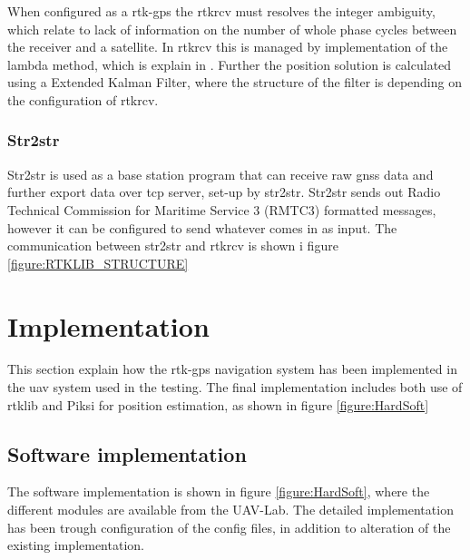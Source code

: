 When configured as a \gls{rtk-gps} the rtkrcv must resolves the integer ambiguity, which relate to lack of information on the number of whole phase cycles between the receiver and a satellite. In rtkrcv this is managed by implementation of the \gls{lambda} method, which is explain in \citep{LAMBDAMETHOD,Ambiguity:Estimation,LAMBDA:METHOD}.
Further the position solution is calculated using a Extended Kalman Filter, where the structure of the filter is depending on the configuration of rtkrcv.
\subsubsection{Str2str}
Str2str is used as a base station program that can receive raw \gls{gnss} data and further export data over tcp server, set-up by str2str. Str2str sends out Radio Technical Commission for Maritime Service 3 (RMTC3) formatted messages, however it can be configured to send whatever comes in as input. The communication between str2str and rtkrcv is shown i figure \ref{figure:RTKLIB_STRUCTURE}
\section{Implementation}
This section explain how the \gls{rtk-gps} navigation system has been implemented in the \gls{uav} system used in the testing. The final implementation includes both use of \gls{rtklib} and Piksi for position estimation, as shown in figure \ref{figure:HardSoft}


\subsection{Software implementation}
The software implementation is shown in figure \ref{figure:HardSoft}, where the different modules are available from the UAV-Lab. The detailed implementation has been trough configuration of the config files, in addition to alteration of the existing implementation.
